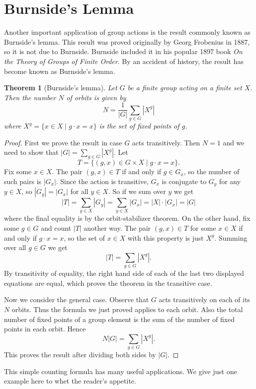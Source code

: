 \documentclass[11pt,oneside]{article}
\newtheorem{thm}{Theorem}[section]
\theoremstyle{definition}
\begin{document}
\newpage
\section{Burnside's Lemma}\noindent
Another important application of group actions is the result commonly
known as Burnside's lemma. This result was proved originally by Georg
Frobenius in 1887, so it is not due to Burnside. Burnside included it
in his popular 1897 book \emph{On the Theory of Groups of Finite
  Order}. By an accident of history, the result has become known as
Burnside's lemma.


\begin{thm}[Burnside's lemma]
  Let $G$ be a finite group acting on a finite set $X$. Then the
  number $N$ of orbits is given by 
  \[
    N = \frac{1}{|G|} \sum_{g \in G} |X^g|
  \]
  where $X^g = \{ x \in X \mid g \cdot x = x\}$ is the set of fixed
  points of $g$.
\end{thm}


\begin{proof}
First we prove the result in case $G$ acts transitively. Then $N=1$
and we need to show that $|G| = \sum_{g \in G} |X^g|$. Let 
\[ T = \{(g,x) \in G \times X \mid g \cdot x = x\}. \]
Fix some $x \in X$. The pair $(g,x) \in T$ if and only if $g \in G_x$,
so the number of such pairs is $|G_x|$. Since the action is
transitive, $G_x$ is conjugate to $G_y$ for any $y \in X$, so $|G_y| =
|G_x|$ for all $y \in X$. So if we sum over $y$ we get
\[
  |T| = \sum_{y \in X} |G_y| = \sum_{y \in X} |G_x| = |X| \cdot |G_x| = |G|
\]
where the final equality is by the orbit-stabilizer theorem. On the
other hand, fix some $g \in G$ and count $|T|$ another way. The pair
$(g,x) \in T$ for some $x \in X$ if and only if $g \cdot x = x$, so
the set of $x \in X$ with this property is just $X^g$. Summing over
all $g \in G$ we get
\[
  |T| = \sum_{g \in G} |X^g|.
\]
By transitivity of equality, the right hand side of each of the last
two displayed equations are equal, which proves the theorem in the
transitive case.

Now we consider the general case. Observe that $G$ acts transitively
on each of its $N$ orbits. Thus the formula we just proved applies to each
orbit. Also the total number of fixed points of a group element is the
sum of the number of fixed points in each orbit. Hence
\[
  N |G| = \sum_{g \in G} |X^g|.
\]
This proves the result after dividing both sides by $|G|$.
\end{proof}

This simple counting formula has many useful applications. We give
just one example here to whet the reader's appetite.
\end{document}
